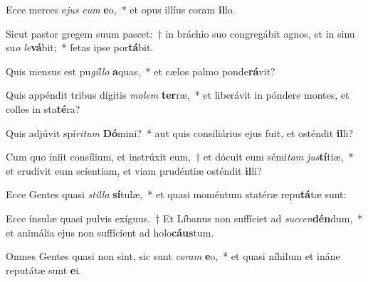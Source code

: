 \item Ecce merces e\textit{jus} \textit{cum} \textbf{e}o,~* et opus illíus coram \textbf{il}lo.
\item Sicut pastor gregem suum pascet:~† in bráchio suo congregábit agnos, et in sinu su\textit{o} \textit{le}\textbf{vá}bit;~* fetas ipse por\textbf{tá}bit.
\item Quis mensus est pu\textit{gíl}\textit{lo} \textbf{a}quas,~* et cælos palmo ponde\textbf{rá}vit?
\item Quis appéndit tribus dígitis \textit{mo}\textit{lem} \textbf{ter}ræ,~* et liberávit in póndere montes, et colles in sta\textbf{té}ra?
\item Quis adjúvit spí\textit{ri}\textit{tum} \textbf{Dó}mini?~* aut quis consiliárius ejus fuit, et osténdit \textbf{il}li?
\item Cum quo íniit consílium, et instrúxit eum,~† et dócuit eum sémi\textit{tam} \textit{jus}\textbf{tí}tiæ,~* et erudívit eum scíentiam, et viam prudéntiæ osténdit \textbf{il}li?
\item Ecce Gentes quasi \textit{stil}\textit{la} \textbf{sí}tulæ,~* et quasi moméntum statéræ repu\textbf{tá}tæ sunt:
\item Ecce ínsulæ quasi pulvis exíguus.~† Et Líbanus non suffíciet ad \textit{suc}\textit{cen}\textbf{dén}dum,~* et animália ejus non suffícient ad holo\textbf{cáus}tum.
\item Omnes Gentes quasi non sint, sic sunt \textit{co}\textit{ram} \textbf{e}o,~* et quasi níhilum et ináne reputátæ sunt \textbf{e}i.
